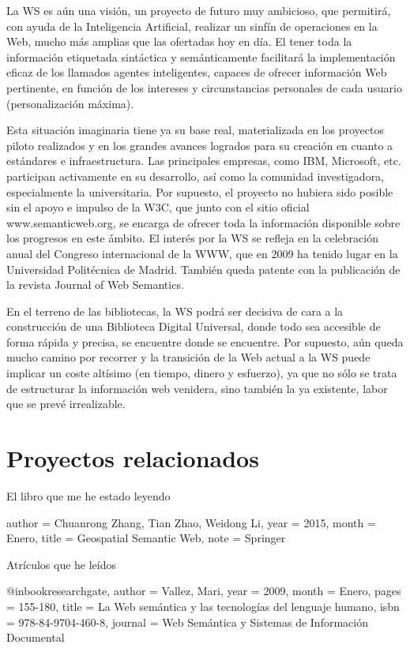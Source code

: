 La WS es aún una visión, un proyecto de futuro muy ambicioso, que permitirá, con ayuda de la Inteligencia Artificial, realizar un sinfín de operaciones en la Web, mucho más amplias que las ofertadas hoy en día. El tener toda la información etiquetada sintáctica y semánticamente facilitará la implementación eficaz de los llamados agentes inteligentes, capaces de ofrecer información Web pertinente, en función de los intereses y circunstancias personales de cada usuario (personalización máxima).



Esta situación imaginaria tiene ya su base real, materializada en los proyectos piloto realizados y en los grandes avances logrados para su creación en cuanto a estándares e infraestructura. Las principales empresas, como IBM, Microsoft, etc. participan activamente en su desarrollo, así como la comunidad investigadora, especialmente la universitaria. Por supuesto, el proyecto no hubiera sido posible sin el apoyo e impulso de la W3C, que junto con el sitio oficial www.semanticweb.org, se encarga de ofrecer toda la información disponible sobre los progresos en este ámbito. El interés por la WS se refleja en la celebración anual del Congreso internacional de la WWW, que en 2009 ha tenido lugar en la Universidad Politécnica de Madrid. También queda patente con la publicación de la revista Journal of Web Semantics.

En el terreno de las bibliotecas, la WS podrá ser decisiva de cara a la construcción de una Biblioteca Digital Universal, donde todo sea accesible de forma rápida y precisa, se encuentre donde se encuentre. Por supuesto, aún queda mucho camino por recorrer y la transición de la Web actual a la WS puede implicar un coste altísimo (en tiempo, dinero y esfuerzo), ya que no sólo se trata de estructurar la información web venidera, sino también la ya existente, labor que se prevé irrealizable.

\section{Proyectos relacionados}


El libro que me he estado leyendo 

author = {Chuanrong Zhang, Tian Zhao, Weidong Li},
year = {2015},
month = {Enero},
title = {Geospatial Semantic Web},
note = {Springer}	


Atrículos que he leídos

@inbook{researchgate,
	author = {Vallez, Mari},
	year = {2009},
	month = {Enero},
	pages = {155-180},
	title = {La Web semántica y las tecnologías del lenguaje humano},
	isbn = {978-84-9704-460-8},
	journal = {Web Semántica y Sistemas de Información Documental}
}

